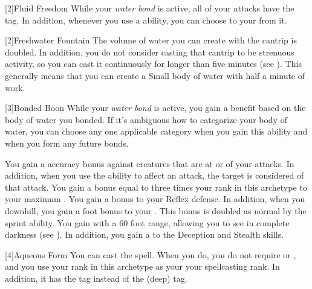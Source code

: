     [2]{Fluid Freedom} While your \textit{water bond} is active, all of your \magical attacks have the \atWater tag.
    In addition, whenever you use a \magical \atWater ability, you can choose to  your  from it.

    [2]{Freshwater Fountain} The volume of water you can create with the  cantrip is doubled.
    In addition, you do not consider casting that cantrip to be strenuous activity, so you can cast it continuously for longer than five minutes (see ).
    This generally means that you can create a Small body of water with half a minute of work.

    [3]{Bonded Boon} While your \textit{water bond} is active, you gain a benefit based on the body of water you bonded.
    If it's ambiguous how to categorize your body of water, you can choose any one applicable category when you gain this ability and when you form any future bonds.
    \begin{raggeditemize}
       You gain a  accuracy bonus against creatures that are at \unaware or \partiallyunaware of your attacks.
        In addition, when you use the  ability to affect an attack, the target is considered \partiallyunaware of that attack.
       You gain a bonus equal to three times your rank in this archetype to your maximum .
       You gain a  bonus to your Reflex defense.
        In addition, when you  downhill, you gain a  foot bonus to your .
        This bonus is doubled as normal by the sprint ability.
       You gain  with a 60 foot range, allowing you to see in complete darkness (see ).
        In addition, you gain a   to the Deception and Stealth skills.
    \end{raggeditemize}

    [4]{Aqueous Form} You can cast the  spell.
      When you do, you do not require  or , and you use your rank in this archetype as your your spellcasting rank.
      In addition, it has the \atAttune tag instead of the \atAttune (deep) tag.

